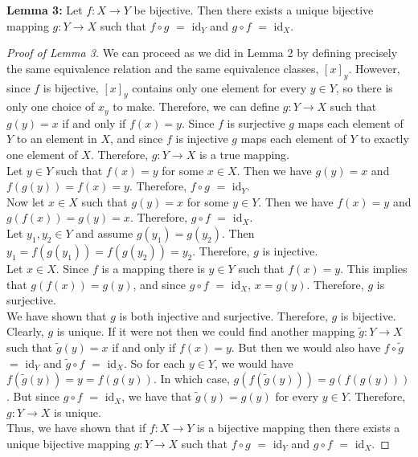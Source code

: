 \documentclass[]{book}
\begin{document}
{\bf Lemma 3:} Let $f:X\to Y$ be bijective. Then there exists a unique bijective mapping $g:Y\to X$ such that $f\circ g$ $=$ id$_Y$ and $g\circ f$ $=$ id$_X$.
\begin{proof}[Proof of Lemma 3]
We can proceed as we did in Lemma 2 by defining precisely the same equivalence relation and the same equivalence classes, $[x]_y$. However, since $f$ is bijective, $[x]_y$ contains only one element for every $y\in Y$, so there is only one choice of $x_y$ to make. Therefore, we can define $g:Y\to X$ such that $g(y)=x$ if and only if $f(x)=y$. Since $f$ is surjective $g$ maps each element of $Y$ to an element in $X$, and since $f$ is injective $g$ maps each element of $Y$ to exactly one element of $X$. Therefore, $g:Y\to X$ is a true mapping. \\
Let $y\in Y$ such that $f(x)=y$ for some $x\in X$. Then we have $g(y)=x$ and $f(g(y))=f(x)=y$. Therefore, $f \circ g$ $=$ id$_Y$. \\
Now let $x\in X$ such that $g(y)=x$ for some $y\in Y$. Then we have $f(x)=y$ and $g(f(x))=g(y)=x$. Therefore, $g\circ f$ $=$ id$_X$. \\
Let $y_1,y_2\in Y$ and assume $g(y_1)=g(y_2)$. Then $y_1=f(g(y_1))=f(g(y_2))=y_2$. Therefore, $g$ is injective. \\
Let $x\in X$. Since $f$ is a mapping there is $y\in Y$ such that $f(x)=y$. This implies that $g(f(x))=g(y)$, and since $g\circ f$ $=$ id$_X$, $x=g(y)$. Therefore, $g$ is surjective. \\
We have shown that $g$ is both injective and surjective. Therefore, $g$ is bijective. \\
Clearly, $g$ is unique. If it were not then we could find another mapping $\tilde{g}:Y\to X$ such that $\tilde{g}(y)=x$ if and only if $f(x)=y$. But then we would also have $f \circ \tilde{g}$ $=$ id$_Y$ and $\tilde{g}\circ f$ $=$ id$_X$. So for each $y\in Y$, we would have $f(\tilde{g}(y))=y=f(g(y))$. In which case, $g(f(\tilde{g}(y)))=g(f(g(y)))$. But since $g\circ f$ $=$ id$_X$, we have that $\tilde{g}(y)=g(y)$ for every $y\in Y$. Therefore, $g:Y\to X$ is unique. \\
Thus, we have shown that if $f:X\to Y$ is a bijective mapping then there exists a unique bijective mapping $g:Y\to X$ such that $f\circ g$ $=$ id$_Y$ and $g\circ f$ $=$ id$_X$.
\end{proof}
\end{document}
